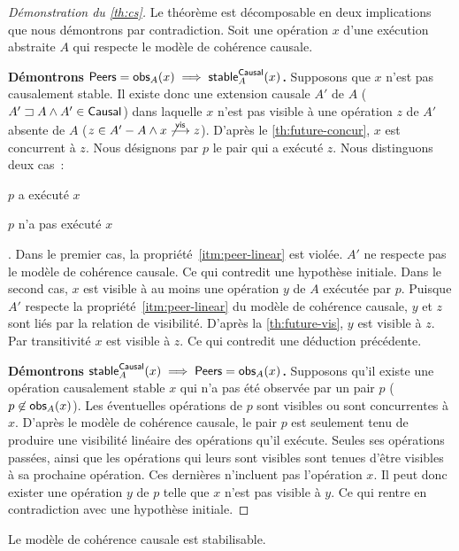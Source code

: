\begin{proof}[Démonstration du \autoref{th:cs}]
Le théorème est décomposable en deux implications que nous démontrons par contradiction.
Soit une opération $x$ d'une exécution abstraite $A$ qui respecte le modèle de cohérence causale.

\textbf{Démontrons $\operatorname{\mathsf{Peers}} = \operatorname{\mathsf{obs}}_A(x) \implies \operatorname{\mathsf{stable}}_A^{\operatorname{\mathsf{Causal}}}(x)$.}
Supposons que $x$ n'est pas causalement stable.
Il existe donc une extension causale $A'$ de $A$ ($A' \sqsupset A \land A' \in \operatorname{\mathsf{Causal}}$) dans laquelle $x$ n'est pas visible à une opération $z$ de $A'$ absente de $A$ ($z \in A' - A \land x \not\overset{\mathsf{vis}}{\longrightarrow} z$).
D'après le \autoref{th:future-concur}, $x$ est concurrent à $z$.
Nous désignons par $p$ le pair qui a exécuté $z$.
Nous distinguons deux cas~: \begin{inlinelist}
    \item $p$ a exécuté $x$
    \item $p$ n'a pas exécuté $x$
\end{inlinelist}.
Dans le premier cas, la propriété~\ref{itm:peer-linear} est violée.
$A'$ ne respecte pas le modèle de cohérence causale.
Ce qui contredit une hypothèse initiale.
Dans le second cas, $x$ est visible à au moins une opération $y$ de $A$ exécutée par $p$.
Puisque $A'$ respecte la propriété~\ref{itm:peer-linear} du modèle de cohérence causale, $y$ et $z$ sont liés par la relation de visibilité.
D'après la \autoref{th:future-vis}, $y$ est visible à $z$.
Par transitivité $x$ est visible à $z$.
Ce qui contredit une déduction précédente.

\textbf{Démontrons $\operatorname{\mathsf{stable}}_A^{\operatorname{\mathsf{Causal}}}(x) \implies \operatorname{\mathsf{Peers}} = \operatorname{\mathsf{obs}}_A(x)$.}
Supposons qu'il existe une opération causalement stable $x$ qui n'a pas été observée par un pair $p$ ($p \not\in \operatorname{\mathsf{obs}}_A(x)$).
Les éventuelles opérations de $p$ sont visibles ou sont concurrentes à $x$.
D'après le modèle de cohérence causale, le pair $p$ est seulement tenu de produire une visibilité linéaire des opérations qu'il exécute.
Seules ses opérations passées, ainsi que les opérations qui leurs sont visibles sont tenues d'être visibles à sa prochaine opération.
Ces dernières n'incluent pas l'opération $x$.
Il peut donc exister une opération $y$ de $p$ telle que $x$ n'est pas visible à $y$.
Ce qui rentre en contradiction avec une hypothèse initiale.
\end{proof}


\begin{theorem}\label{th:stabilizable-causal}
Le modèle de cohérence causale est stabilisable.
\end{theorem}


